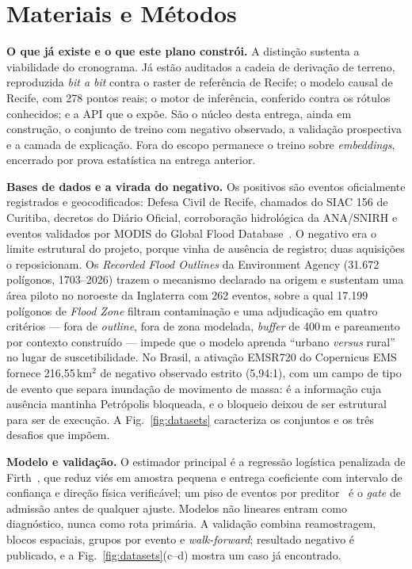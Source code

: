 \documentclass[conference]{IEEEtran}
\begin{document}
\section{Materiais e Métodos}

\textbf{O que já existe e o que este plano constrói.} A distinção sustenta a
viabilidade do cronograma. Já estão auditados a cadeia de derivação de terreno,
reproduzida \emph{bit a bit} contra o raster de referência de Recife; o modelo
causal de Recife, com 278 pontos reais; o motor de inferência, conferido contra
os rótulos conhecidos; e a API que o expõe. São o núcleo desta entrega, ainda em
construção, o conjunto de treino com negativo observado, a validação prospectiva
e a camada de explicação. Fora do escopo permanece o treino sobre
\emph{embeddings}, encerrado por prova estatística na entrega anterior.

\textbf{Bases de dados e a virada do negativo.} Os positivos são eventos
oficialmente registrados e geocodificados: Defesa Civil de Recife, chamados do
SIAC 156 de Curitiba, decretos do Diário Oficial, corroboração hidrológica da
ANA/SNIRH e eventos validados por MODIS do Global Flood
Database~\cite{tellman2021}. O negativo era o limite estrutural do projeto,
porque vinha de ausência de registro; duas aquisições o reposicionam. Os
\emph{Recorded Flood Outlines} da Environment Agency (31.672 polígonos,
1703--2026) trazem o mecanismo declarado na origem e sustentam uma área piloto no
noroeste da Inglaterra com 262 eventos, sobre a qual 17.199 polígonos de
\emph{Flood Zone} filtram contaminação e uma adjudicação em quatro critérios ---
fora de \emph{outline}, fora de zona modelada, \emph{buffer} de 400\,m e
pareamento por contexto construído --- impede que o modelo aprenda ``urbano
\emph{versus} rural'' no lugar de suscetibilidade. No Brasil, a ativação EMSR720
do Copernicus EMS fornece 216,55\,km$^2$ de negativo observado estrito (5,94:1),
com um campo de tipo de evento que separa inundação de movimento de massa: é a
informação cuja ausência mantinha Petrópolis bloqueada, e o bloqueio deixou de
ser estrutural para ser de execução. A Fig.~\ref{fig:datasets} caracteriza os
conjuntos e os três desafios que impõem.

\textbf{Modelo e validação.} O estimador principal é a regressão logística
penalizada de Firth~\cite{firth1993}, que reduz viés em amostra pequena e entrega
coeficiente com intervalo de confiança e direção física verificável; um piso de
eventos por preditor~\cite{peduzzi1996} é o \emph{gate} de admissão antes de
qualquer ajuste. Modelos não lineares entram como diagnóstico, nunca como rota
primária. A validação combina reamostragem, blocos espaciais, grupos por evento e
\emph{walk-forward}; resultado negativo é publicado, e a
Fig.~\ref{fig:datasets}(c--d) mostra um caso já encontrado.
\end{document}
